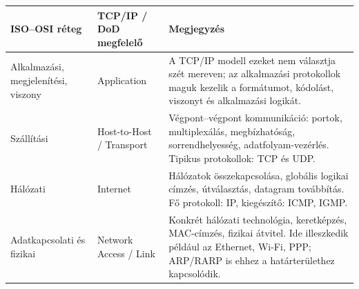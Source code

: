 \begin{tabularx}{\textwidth}{L{31mm}L{34mm}X}
\toprule
\textbf{ISO--OSI réteg} & \textbf{TCP/IP / DoD megfelelő} & \textbf{Megjegyzés} \\
\midrule
Alkalmazási, megjelenítési, viszony & Application & A TCP/IP modell ezeket nem választja szét mereven; az alkalmazási protokollok maguk kezelik a formátumot, kódolást, viszonyt és alkalmazási logikát. \\
Szállítási & Host-to-Host / Transport & Végpont--végpont kommunikáció: portok, multiplexálás, megbízhatóság, sorrendhelyesség, adatfolyam-vezérlés. Tipikus protokollok: TCP és UDP. \\
Hálózati & Internet & Hálózatok összekapcsolása, globális logikai címzés, útválasztás, datagram továbbítás. Fő protokoll: IP, kiegészítő: ICMP, IGMP. \\
Adatkapcsolati és fizikai & Network Access / Link & Konkrét hálózati technológia, keretképzés, MAC-címzés, fizikai átvitel. Ide illeszkedik például az Ethernet, Wi-Fi, PPP; ARP/RARP is ehhez a határterülethez kapcsolódik. \\
\bottomrule
\end{tabularx}
